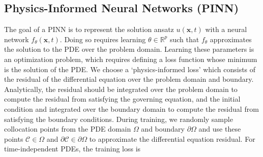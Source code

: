 \subsection{Physics-Informed Neural Networks (PINN)}
The goal of a PINN is to represent the solution ansatz $u(\bm{x},t)$ with a neural network $f_\theta(\bm{x},t)$. 
Doing so requires learning $\theta \in \mathbb{R}^p$ such that $f_\theta$ approximates the solution to the PDE over the problem domain.
Learning these parameters is an optimization problem, which requires defining a loss function whose minimum is the solution of the PDE.
We choose a `physics-informed loss' which consists of the residual of the differential equation over the problem domain and boundary. Analytically, the residual should be integrated over the problem domain to compute the residual from satisfying the governing equation, and the initial condition and integrated over the boundary domain to compute the residual from satisfying the boundary conditions.
During training, we randomly sample collocation points from the PDE domain $\Omega$ and boundary $\partial \Omega$ and use these points $\mathcal{C} \in \Omega$ and $\partial \mathcal{C} \in \partial \Omega$ to approximate the differential equation residual. For time-independent PDEs, the training loss is
